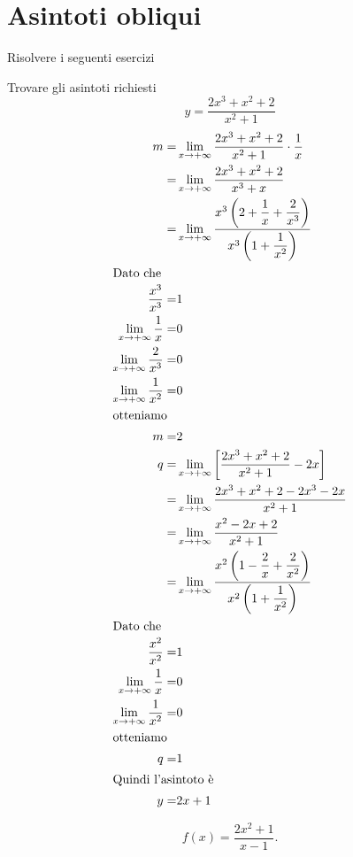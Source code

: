 \section{Asintoti obliqui }
Risolvere i seguenti esercizi
\begin{exercise}
	Trovare gli asintoti richiesti
	\[y=\dfrac{2x^3+x^2+2}{x^2+1}\]
	\tcblower
	\begin{align*}
	m=&\lim_{x\to +\infty}\dfrac{2x^3+x^2+2}{x^2+1}\cdot\dfrac{1}{x}\\
	=&\lim_{x\to +\infty}\dfrac{2x^3+x^2+2}{x^3+x}\\
	=&\lim_{x\to +\infty}\dfrac{x^3\left(2+\dfrac{1}{x}+\dfrac{2}{x^3}\right)}{x^3\left(1+\dfrac{1}{x^2}\right)}\\
	\intertext{Dato che}
	\dfrac{x^3}{x^3}=&1\\
	\lim_{x\to +\infty}\dfrac{1}{x}=&0\\
	\lim_{x\to +\infty}\dfrac{2}{x^3}=&0\\
	\lim_{x\to +\infty}\dfrac{1}{x^2}=&0\\
	\intertext{otteniamo}
	m=&2\\
	q=&\lim_{x\to +\infty}\left[\dfrac{2x^3+x^2+2}{x^2+1}-2x\right]\\
	=&\lim_{x\to +\infty}\dfrac{2x^3+x^2+2-2x^3-2x}{x^2+1}\\
	=&\lim_{x\to +\infty}\dfrac{x^2-2x+2}{x^2+1}\\
	=&\lim_{x\to +\infty}\dfrac{x^2\left(1-\dfrac{2}{x}+\dfrac{2}{x^2}\right)}{x^2\left(1+\dfrac{1}{x^2}\right)}\\
	\intertext{Dato che}
	\dfrac{x^2}{x^2}=&1\\
	\lim_{x\to +\infty}\dfrac{1}{x}=&0\\
	\lim_{x\to +\infty}\dfrac{1}{x^2}=&0\\
	\intertext{otteniamo}
	q=&1\\
	\intertext{Quindi l'asintoto è}
	y=&2x+1
	\end{align*}
\end{exercise}
\begin{exercise}[no solution]
	
	\begin{equation*}
	f(x)= \frac{2x^2+1}{x-1}.
	\end{equation*}
\end{exercise}
